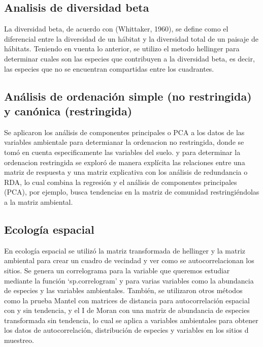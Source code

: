 \documentclass[11pt,]{article}
\begin{document}
\subsection{Analisis de diversidad
beta}\label{analisis-de-diversidad-beta}

La diversidad beta, de acuerdo con (Whittaker, 1960), se define como el
diferencial entre la diversidad de un hábitat y la diversidad total de
un paisaje de hábitats. Teniendo en vuenta lo anterior, se utilizo el
metodo hellinger para determinar cuales son las especies que contribuyen
a la diversidad beta, es decir, las especies que no se encuentran
compartidas entre los cuadrantes.

\subsection{Análisis de ordenación simple (no restringida) y canónica
(restringida)}\label{anuxe1lisis-de-ordenaciuxf3n-simple-no-restringida-y-canuxf3nica-restringida}

Se aplicaron los análisis de componentes principales o PCA a los datos
de las variables ambientale para determianar la ordenacion no
restringida, donde se tomó en cuenta especificamente las variables del
suelo. y para determinar la ordenacion restringida se exploró de manera
explícita las relaciones entre una matriz de respuesta y una matriz
explicativa con los análisis de redundancia o RDA, lo cual combina la
regresión y el análisis de componentes principales (PCA), por ejemplo,
busca tendencias en la matriz de comunidad restringiéndolas a la matriz
ambiental.

\subsection{Ecología espacial}\label{ecologuxeda-espacial}

En ecología espacial se utilizó la matriz transformada de hellinger y la
matriz ambiental para crear un cuadro de vecindad y ver como se
autocorrelacionan los sitios. Se genera un correlograma para la variable
que queremos estudiar mediante la función `sp.correlogram' y para varias
variables como la abundancia de especies y las variables ambientales.
También, se utilizaron otros métodos como la prueba Mantel con matrices
de distancia para autocorrelación espacial con y sin tendencia, y el I
de Moran con una matriz de abundancia de especies transformada sin
tendencia, lo cual se aplica a variables ambientales para obtener los
datos de autocorrelación, distribución de especies y variables en los
sitios d muestreo.
\end{document}
